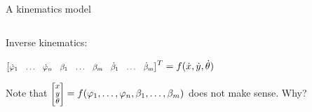\documentclass[compress]{beamer}
\newcommand{\colvec}[2][.8]{%
  \scalebox{#1}{%
    \renewcommand{\arraystretch}{.8}%
    $\begin{bmatrix}#2\end{bmatrix}$%
  }
}
\begin{document}
\begin{frame}{A kinematics model}
\begin{columns}
\begin{column}{0.3\linewidth}
{
            }

            \end{column}
        \end{columns}


        \pause

    Inverse kinematics:

    $
        \colvec{\dot\varphi_1 & \ldots & \dot\varphi_n& \beta_1 & \ldots &
        \beta_m & \dot\beta_1 & \ldots & \dot\beta_m}^T = f(\dot{x},
        \dot{y},\dot\theta)
    $

Note that  $\colvec{x \\ y \\ \theta } =
        f(\varphi_1,\ldots,\varphi_n,\beta_1,\ldots,\beta_m)$ does not make sense. Why?


\end{frame}
\end{document}
